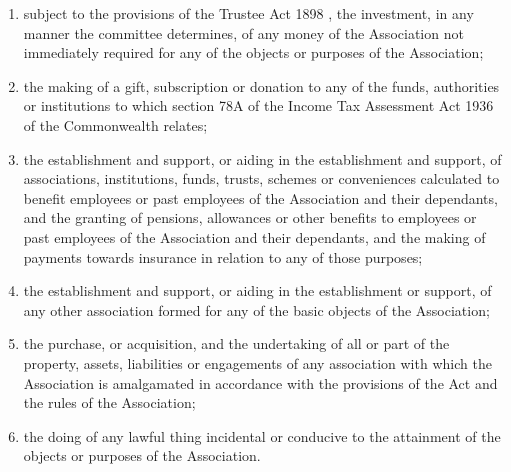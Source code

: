 \documentclass[a4paper,11pt]{article}
\begin{document}
\begin{enumerate}
	\item subject to the provisions of the Trustee Act 1898 , the investment, in any manner the committee determines, of any money of the Association not immediately required for any of the objects or purposes of the Association;
	\item the making of a gift, subscription or donation to any of the funds, authorities or institutions to which section 78A of the Income Tax Assessment Act 1936 of the Commonwealth relates;
	\item the establishment and support, or aiding in the establishment and support, of associations, institutions, funds, trusts, schemes or conveniences calculated to benefit employees or past employees of the Association and their dependants, and the granting of pensions, allowances or other benefits to employees or past employees of the Association and their dependants, and the making of payments towards insurance in relation to any of those purposes;
	\item the establishment and support, or aiding in the establishment or support, of any other association formed for any of the basic objects of the Association;
	\item the purchase, or acquisition, and the undertaking of all or part of the property, assets, liabilities or engagements of any association with which the Association is amalgamated in accordance with the provisions of the Act and the rules of the Association;
	\item the doing of any lawful thing incidental or conducive to the attainment of the objects or purposes of the Association.
\end{enumerate}
\end{document}
